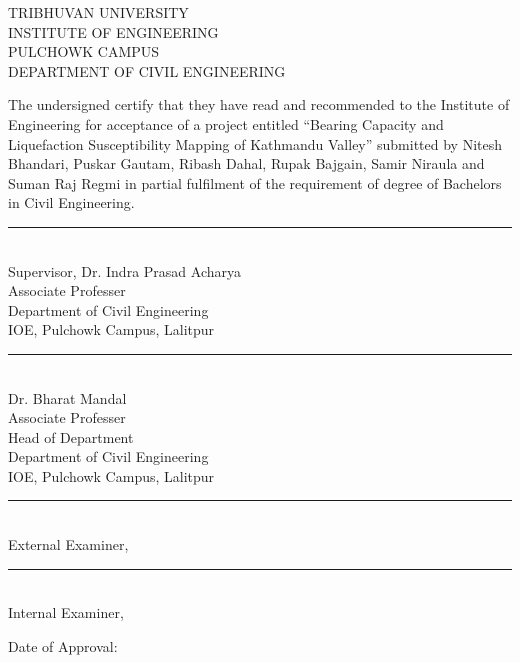 \begin{titlepage}
\begin{center}
	\large 
	TRIBHUVAN UNIVERSITY\\
	INSTITUTE OF ENGINEERING\\
	PULCHOWK CAMPUS\\
	DEPARTMENT OF CIVIL ENGINEERING
\end{center}
\vfill
The undersigned certify that they have read and recommended to the Institute of Engineering for acceptance of a project entitled “Bearing Capacity and Liquefaction Susceptibility Mapping of Kathmandu Valley” submitted by Nitesh Bhandari, Puskar Gautam, Ribash Dahal, Rupak Bajgain, Samir Niraula and Suman Raj Regmi in partial fulfilment of the requirement of degree of Bachelors in Civil Engineering.
\vfill

\begin{minipage}[t]{0.48\linewidth}
\rule{0.7\textwidth}{0.4pt}\\
Supervisor, Dr. Indra Prasad Acharya\\
Associate Professer\\
Department of Civil Engineering\\
IOE, Pulchowk Campus, Lalitpur
\end{minipage}%
\begin{minipage}[t]{0.48\linewidth}
\rule{0.7\textwidth}{0.4pt}\\
Dr. Bharat Mandal\\
Associate Professer\\
Head of Department\\
Department of Civil Engineering\\
IOE, Pulchowk Campus, Lalitpur
\end{minipage}

\vfill
\begin{minipage}[t]{0.48\linewidth}
\rule{0.7\textwidth}{0.4pt}\\
External Examiner,
\end{minipage}%
\begin{minipage}[t]{0.48\linewidth}
\rule{0.7\textwidth}{0.4pt}\\
Internal Examiner,
\end{minipage}

\vfill

Date of Approval:
\end{titlepage}